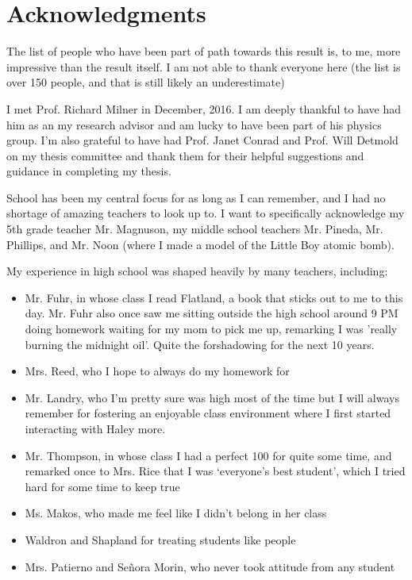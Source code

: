 \iflong
\fi
\section*{Acknowledgments}
The list of people who have been part of path towards this result is, to me, more impressive than the result itself. I am not able to thank everyone here (the list is over 150 people, and that is still likely an underestimate)

I met Prof. Richard Milner in December, 2016. I am deeply thankful to have had him as an my research advisor and am lucky to have been part of his physics group. I'm also grateful to have had Prof. Janet Conrad and Prof. Will Detmold on my thesis committee and thank them for their helpful suggestions and guidance in completing my thesis.

School has been my central focus for as long as I can remember, and I had no shortage of amazing teachers to look up to. I want to specifically acknowledge my 5th grade teacher Mr. Magnuson, my middle school teachers Mr. Pineda, Mr. Phillips, and Mr. Noon (where I made a model of the Little Boy atomic bomb). 

My experience in high school was shaped heavily by many teachers, including:
\begin{itemize}
    \item Mr. Fuhr, in whose class I read Flatland, a book that sticks out to me to this day. Mr. Fuhr also once saw me sitting outside the high school around 9 PM doing homework waiting for my mom to pick me up, remarking I was 'really burning the midnight oil'. Quite the forshadowing for the next 10 years. 
    \item Mrs. Reed, who I hope to always do my homework for
    \item Mr. Landry, who I'm pretty sure was high most of the time but I will always remember for fostering an enjoyable class environment where I first started interacting with Haley more. 
    \item Mr. Thompson, in whose class I had a perfect 100 for quite some time, and remarked once to Mrs. Rice that I was `everyone's best student', which I tried hard for some time to keep true
    \item Ms. Makos, who made me feel like I didn't belong in her class
    \item Waldron and Shapland for treating students like people
    \item Mrs. Patierno and Se\~nora Morin, who never took attitude from any student    
\end{itemize} 

